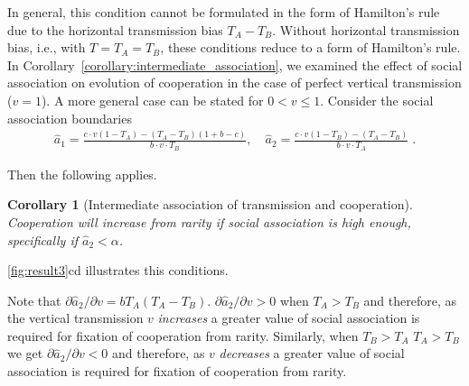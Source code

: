\documentclass[12pt]{extarticle}
\newtheorem{corollary}{Corollary}
\begin{document}
{%

In general, this condition cannot be formulated in the form of Hamilton's rule due to the horizontal transmission bias $T_A-T_B$.
Without horizontal transmission bias, i.e., with $T=T_A=T_B$, these conditions reduce to a form of Hamilton's rule.
\\

In Corollary~\autoref{corollary:intermediate_association}, we examined the effect of social association on evolution of cooperation in the case of perfect vertical transmission ($v=1$).
A more general case can be stated for $0 < v \leq 1$.
Consider the social association boundaries 
\begin{equation}\begin{aligned}\label{eq:boundries_assortative_meeting_general_case}
  \hat{a}_1 = \frac{c\cdot v(1-T_A) -(T_A-T_B)(1+b-c)}{b\cdot v \cdot T_B}, \quad
  \hat{a}_2 = \frac{c\cdot v(1-T_B)-(T_A-T_B)}{b\cdot v\cdot T_A} \;.
\end{aligned}\end{equation}

Then the following applies.
\\

\begin{corollary}[Intermediate association of transmission and cooperation]
\label{corollary:intermediate_association_res3}
Cooperation will increase from rarity if social association is high enough, specifically if $\hat a_2 < \alpha$.
\end{corollary}
\autoref{fig:result3}cd illustrates this conditions.

Note that $\partial \hat a_2 / \partial v = b T_A (T_A-T_B)$. $\partial \hat a_2 / \partial v > 0$ when $T_A > T_B$ and therefore, as the vertical transmission $v$ \emph{increases} a greater value of social association is required for fixation of cooperation from rarity.
Similarly, when $T_B>T_A$ $T_A > T_B$ we get $\partial \hat a_2 / \partial v < 0$ and therefore, as $v$ \emph{decreases} a greater value of social association is required for fixation of cooperation from rarity.
\\

}
\end{document}
